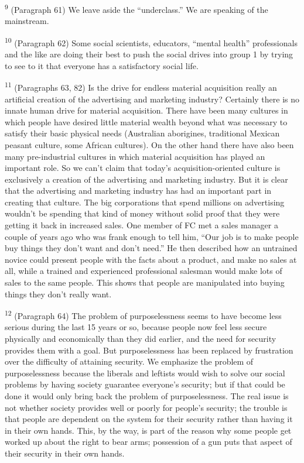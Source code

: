 \documentclass{article}
\begin{document}
\textsuperscript{9} (Paragraph 61) We leave aside the “underclass.” We are speaking of the mainstream. \vspace{\baselineskip}

\textsuperscript{10} (Paragraph 62) Some social scientists, educators, “mental health” professionals and the like are 
doing their best to push the social drives into group 1 by trying to see to it that everyone has a 
satisfactory social life. \vspace{\baselineskip}

\textsuperscript{11} (Paragraphs 63, 82) Is the drive for endless material acquisition really an artificial creation of 
the advertising and marketing industry? Certainly there is no innate human drive for material 
acquisition. There have been many cultures in which people have desired little material wealth 
beyond what was necessary to satisfy their basic physical needs (Australian aborigines, 
traditional Mexican peasant culture, some African cultures). On the other hand there have also 
been many pre-industrial cultures in which material acquisition has played an important role. So 
we can’t claim that today’s acquisition-oriented culture is exclusively a creation of the 
advertising and marketing industry. But it is clear that the advertising and marketing industry 
has had an important part in creating that culture. The big corporations that spend millions on 
advertising wouldn’t be spending that kind of money without solid proof that they were getting it 
back in increased sales. One member of FC met a sales manager a couple of years ago who was 
frank enough to tell him, “Our job is to make people buy things they don’t want and don’t need.” 
He then described how an untrained novice could present people with the facts about a product, 
and make no sales at all, while a trained and experienced professional salesman would make lots 
of sales to the same people. This shows that people are manipulated into buying things they 
don’t really want. \vspace{\baselineskip}

\textsuperscript{12} (Paragraph 64) The problem of purposelessness seems to have become less serious during the 
last 15 years or so, because people now feel less secure physically and economically than they 
did earlier, and the need for security provides them with a goal. But purposelessness has been 
replaced by frustration over the difficulty of attaining security. We emphasize the problem of 
purposelessness because the liberals and leftists would wish to solve our social problems by 
having society guarantee everyone’s security; but if that could be done it would only bring back 
the problem of purposelessness. The real issue is not whether society provides well or poorly for 
people’s security; the trouble is that people are dependent on the system for their security rather 
than having it in their own hands. This, by the way, is part of the reason why some people get 
worked up about the right to bear arms; possession of a gun puts that aspect of their security in 
their own hands. \vspace{\baselineskip} \newpage
\end{document}
